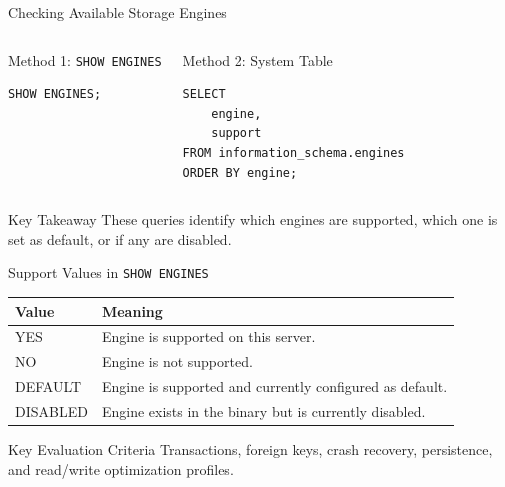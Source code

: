 \documentclass[aspectratio=169,11pt]{beamer}
\newcommand{\code}[1]{\texttt{#1}}
\begin{document}
\begin{frame}[fragile]{Checking Available Storage Engines}
\begin{columns}[T,onlytextwidth]
\begin{block}{Method 1: \code{SHOW ENGINES}}
\begin{lstlisting}
SHOW ENGINES;
\end{lstlisting}
\end{block}
\begin{block}{Method 2: System Table}
\begin{lstlisting}
SELECT
    engine,
    support
FROM information_schema.engines
ORDER BY engine;
\end{lstlisting}
\end{block}
\end{columns}
\vspace{0.25cm}
\begin{alertblock}{Key Takeaway}
These queries identify which engines are supported, which one is set as default, or if any are disabled.
\end{alertblock}
\end{frame}

\begin{frame}{Support Values in \code{SHOW ENGINES}}
\begin{center}
\begin{tabularx}{0.88\textwidth}{>{\ttfamily}l X}
\toprule
\textbf{Value} & \textbf{Meaning} \\
\midrule
YES & Engine is supported on this server. \\
NO & Engine is not supported. \\
DEFAULT & Engine is supported and currently configured as default. \\
DISABLED & Engine exists in the binary but is currently disabled. \\
\bottomrule
\end{tabularx}
\end{center}
\begin{block}{Key Evaluation Criteria}
Transactions, foreign keys, crash recovery, persistence, and read/write optimization profiles.
\end{block}
\end{frame}
\end{document}
